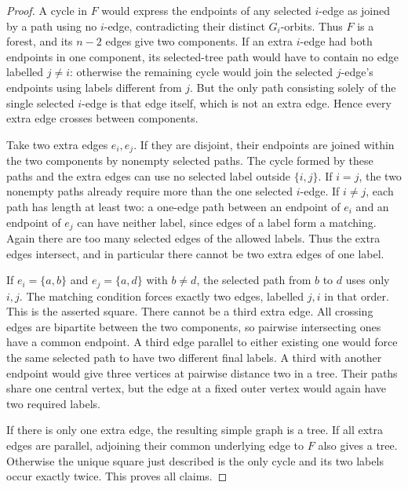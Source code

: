 \begin{proof}
A cycle in $F$ would express the endpoints of any selected $i$-edge
as joined by a path using no $i$-edge, contradicting their distinct
$G_i$-orbits. Thus $F$ is a forest, and its $n-2$ edges give two
components. If an extra $i$-edge had both endpoints in one component,
its selected-tree path would have to contain no edge labelled $j\ne i$:
otherwise the remaining cycle would join the selected $j$-edge's
endpoints using labels different from $j$. But the only path consisting
solely of the single selected $i$-edge is that edge itself, which is
not an extra edge. Hence every extra edge crosses between components.

Take two extra edges $e_i,e_j$. If they are disjoint, their endpoints
are joined within the two components by nonempty selected paths. The
cycle formed by these paths and the extra edges can use no selected
label outside $\{i,j\}$. If $i=j$, the two nonempty paths already
require more than the one selected $i$-edge. If $i\ne j$, each path
has length at least two: a one-edge path between an endpoint of $e_i$
and an endpoint of $e_j$ can have neither label, since edges of a label
form a matching. Again there are too many selected edges of the allowed
labels. Thus the extra edges intersect, and in particular there cannot
be two extra edges of one label.

If $e_i=\{a,b\}$ and $e_j=\{a,d\}$ with $b\ne d$, the selected
path from $b$ to $d$ uses only $i,j$. The matching condition forces
exactly two edges, labelled $j,i$ in that order. This is the asserted
square. There cannot be a third extra edge. All crossing edges are
bipartite between the two components, so pairwise intersecting ones
have a common endpoint. A third edge parallel to either existing one
would force the same selected path to have two different final labels.
A third with another endpoint would give three vertices at pairwise
distance two in a tree. Their paths share one central vertex, but the
edge at a fixed outer vertex would again have two required labels.

If there is only one extra edge, the resulting simple graph is a tree.
If all extra edges are parallel, adjoining their common underlying edge
to $F$ also gives a tree. Otherwise the unique square just described is
the only cycle and its two labels occur exactly twice. This proves all
claims.
\end{proof}

